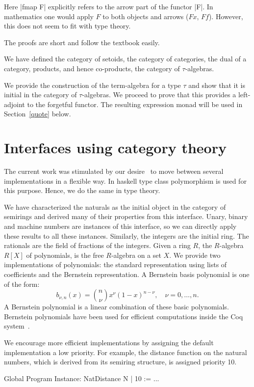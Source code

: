\documentclass[a4paper,10pt, runningheads]{llncs}
\begin{document}
Here |fmap F| explicitly refers to the arrow part of the functor |F|.
In mathematics one would apply $F$ to both objects and arrows ($F x$, $F f$). However, this does
not seem to fit with type theory.

The proofs are short and follow the textbook easily.

We have defined the category of setoids, the category of categories, the dual of a category,
products, and hence co-products, the category of $\tau$-algebras.

We provide the construction of the term-algebra for a type $\tau$ and show that it is
initial in the category of $\tau$-algebras. We proceed to prove that this provides a left-adjoint
to the forgetful functor. The resulting expression monad will be used in Section~\ref{quote} below.

\section{Interfaces using category theory}\label{interfaces}\label{modul}
The current work was stimulated by our desire~\cite{Riemann} to move between several
implementations in a flexible way. In haskell type class polymorphism is used for this purpose.
Hence, we do the same in type theory.

We have characterized the naturals as the initial object in the category of semirings and derived
many of their properties from this interface. Unary, binary and machine numbers are
instances of this interface, so we can directly apply these results to all these instances.
Similarly, the integers are the initial ring. The rationals are the field of fractions of the
integers. 
Given a ring $R$, the $R$-algebra $R[X]$ of polynomials, is the free $R$-algebra on a set $X$.
We provide two implementations of polynomials: the
standard representation using lists of coefficients and the Bernstein representation. A Bernstein
basis polynomial is one of the form:
\[b_{\nu,n}(x) = {n \choose \nu} x^{\nu} \left( 1 - x \right)^{n - \nu}, \quad \nu = 0, \ldots, n.\]
A Bernstein polynomial is a linear combination of these basic polynomials. Bernstein polynomials
have been used for efficient computations inside the Coq system~\cite{ZumkellerPhD}.

We encourage more efficient implementations by assigning the default implementation a
low priority. For example, the distance function on the natural numbers, which is derived from its
semiring structure, is assigned priority 10.
\begin{code}
  Global Program Instance: NatDistance N | 10 := ...
\end{code}
\end{document}
